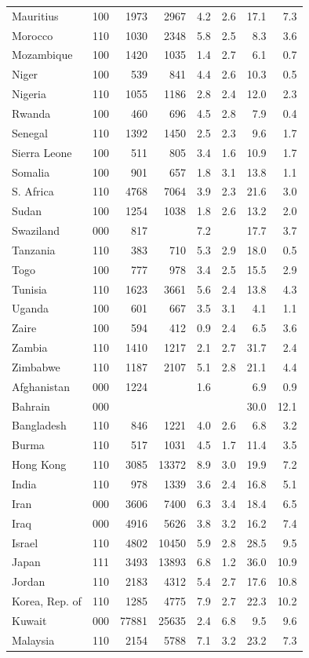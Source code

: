 \documentclass[11pt]{article}
\begin{document}
\begin{longtable}{lcrrrrrr}
Mauritius&100&1973&2967&4.2&2.6&17.1&7.3\\
Morocco&110&1030&2348&5.8&2.5&8.3&3.6\\
Mozambique&100&1420&1035&1.4&2.7&6.1&0.7\\
Niger&100&539&841&4.4&2.6&10.3&0.5\\
Nigeria&110&1055&1186&2.8&2.4&12.0&2.3\\
Rwanda&100&460&696&4.5&2.8&7.9&0.4\\
Senegal&110&1392&1450&2.5&2.3&9.6&1.7\\
Sierra Leone&100&511&805&3.4&1.6&10.9&1.7\\
Somalia&100&901&657&1.8&3.1&13.8&1.1\\
S. Africa&110&4768&7064&3.9&2.3&21.6&3.0\\
Sudan&100&1254&1038&1.8&2.6&13.2&2.0\\
Swaziland&000&817&&7.2&&17.7&3.7\\
Tanzania&110&383&710&5.3&2.9&18.0&0.5\\
Togo&100&777&978&3.4&2.5&15.5&2.9\\
Tunisia&110&1623&3661&5.6&2.4&13.8&4.3\\
Uganda&100&601&667&3.5&3.1&4.1&1.1\\
Zaire&100&594&412&0.9&2.4&6.5&3.6\\
Zambia&110&1410&1217&2.1&2.7&31.7&2.4\\
Zimbabwe&110&1187&2107&5.1&2.8&21.1&4.4\\
Afghanistan&000&1224&&1.6&&6.9&0.9\\
Bahrain&000&&&&&30.0&12.1\\
Bangladesh&110&846&1221&4.0&2.6&6.8&3.2\\
Burma&110&517&1031&4.5&1.7&11.4&3.5\\
Hong Kong&110&3085&13372&8.9&3.0&19.9&7.2\\
India&110&978&1339&3.6&2.4&16.8&5.1\\
Iran&000&3606&7400&6.3&3.4&18.4&6.5\\
Iraq&000&4916&5626&3.8&3.2&16.2&7.4\\
Israel&110&4802&10450&5.9&2.8&28.5&9.5\\
Japan&111&3493&13893&6.8&1.2&36.0&10.9\\
Jordan&110&2183&4312&5.4&2.7&17.6&10.8\\
Korea, Rep. of&110&1285&4775&7.9&2.7&22.3&10.2\\
Kuwait&000&77881&25635&2.4&6.8&9.5&9.6\\
Malaysia&110&2154&5788&7.1&3.2&23.2&7.3\\

\end{longtable}
\end{document}

